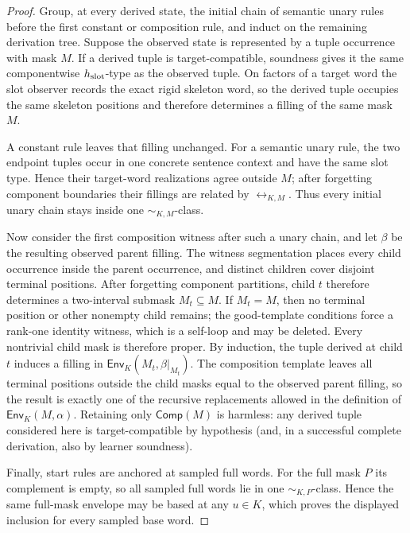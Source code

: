 \documentclass[11pt]{article}
\newcommand{\Comp}{\mathsf{Comp}}
\newcommand{\Env}{\mathsf{Env}}
\begin{document}
\begin{proof}
Group, at every derived state, the initial chain of semantic unary rules before
the first constant or composition rule, and induct on the remaining derivation
tree.  Suppose the observed state is represented by a tuple occurrence with
mask $M$.  If a derived tuple is target-compatible, soundness gives it the
same componentwise $h_{\rm slot}$-type as the observed tuple.  On factors of a
target word the slot observer records the exact rigid skeleton word, so the
derived tuple occupies the same skeleton positions and therefore determines a
filling of the same mask $M$.

A constant rule leaves that filling unchanged.  For a semantic unary rule,
the two endpoint tuples occur in one concrete sentence context and have the
same slot type.  Hence their target-word realizations agree outside $M$;
after forgetting component boundaries their fillings are related by
$\leftrightarrow_{K,M}$.  Thus every initial unary chain stays inside one
$\sim_{K,M}$-class.

Now consider the first composition witness after such a unary chain, and let
$\beta$ be the resulting observed parent filling.  The witness segmentation
places every child occurrence inside the parent occurrence, and distinct
children cover disjoint terminal positions.  After forgetting component
partitions, child $t$ therefore determines a two-interval submask $M_t\subseteq
M$.  If $M_t=M$, then no terminal position or other nonempty child remains;
the good-template conditions force a rank-one identity witness, which is a
self-loop and may be deleted.  Every nontrivial child mask is therefore proper.
By induction, the tuple derived at child $t$ induces a filling in
$\Env_K(M_t,\beta|_{M_t})$.  The composition template leaves all terminal
positions outside the child masks equal to the observed parent filling, so the
result is exactly one of the recursive replacements allowed in the definition
of $\Env_K(M,\alpha)$.  Retaining only $\Comp(M)$ is harmless: any derived
tuple considered here is target-compatible by hypothesis (and, in a successful
complete derivation, also by learner soundness).

Finally, start rules are anchored at sampled full words.  For the full mask
$P$ its complement is empty, so all sampled full words lie in one
$\sim_{K,P}$-class.  Hence the same full-mask envelope may be based at any
$u\in K$, which proves the displayed inclusion for every sampled base word.
\end{proof}
\end{document}
